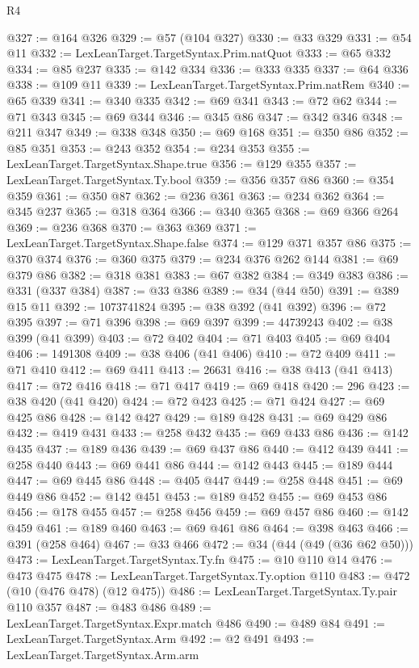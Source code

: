 \begin{lexlean}{R4}
\begin{coremodule}
@327 := @164 @326
@329 := @57 (@104 @327)
@330 := @33 @329
@331 := @54 @11
@332 := LexLeanTarget.TargetSyntax.Prim.natQuot
@333 := @65 @332
@334 := @85 @237
@335 := @142 @334
@336 := @333 @335
@337 := @64 @336
@338 := @109 @11
@339 := LexLeanTarget.TargetSyntax.Prim.natRem
@340 := @65 @339
@341 := @340 @335
@342 := @69 @341
@343 := @72 @62
@344 := @71 @343
@345 := @69 @344
@346 := @345 @86
@347 := @342 @346
@348 := @211 @347
@349 := @338 @348
@350 := @69 @168
@351 := @350 @86
@352 := @85 @351
@353 := @243 @352
@354 := @234 @353
@355 := LexLeanTarget.TargetSyntax.Shape.true
@356 := @129 @355
@357 := LexLeanTarget.TargetSyntax.Ty.bool
@359 := @356 @357 @86
@360 := @354 @359
@361 := @350 @87
@362 := @236 @361
@363 := @234 @362
@364 := @345 @237
@365 := @318 @364
@366 := @340 @365
@368 := @69 @366 @264
@369 := @236 @368
@370 := @363 @369
@371 := LexLeanTarget.TargetSyntax.Shape.false
@374 := @129 @371 @357 @86
@375 := @370 @374
@376 := @360 @375
@379 := @234 @376 @262 @144
@381 := @69 @379 @86
@382 := @318 @381
@383 := @67 @382
@384 := @349 @383
@386 := @331 (@337 @384)
@387 := @33 @386
@389 := @34 (@44 @50)
@391 := @389 @15 @11
@392 := 1073741824
@395 := @38 @392 (@41 @392)
@396 := @72 @395
@397 := @71 @396
@398 := @69 @397
@399 := 44739243
@402 := @38 @399 (@41 @399)
@403 := @72 @402
@404 := @71 @403
@405 := @69 @404
@406 := 1491308
@409 := @38 @406 (@41 @406)
@410 := @72 @409
@411 := @71 @410
@412 := @69 @411
@413 := 26631
@416 := @38 @413 (@41 @413)
@417 := @72 @416
@418 := @71 @417
@419 := @69 @418
@420 := 296
@423 := @38 @420 (@41 @420)
@424 := @72 @423
@425 := @71 @424
@427 := @69 @425 @86
@428 := @142 @427
@429 := @189 @428
@431 := @69 @429 @86
@432 := @419 @431
@433 := @258 @432
@435 := @69 @433 @86
@436 := @142 @435
@437 := @189 @436
@439 := @69 @437 @86
@440 := @412 @439
@441 := @258 @440
@443 := @69 @441 @86
@444 := @142 @443
@445 := @189 @444
@447 := @69 @445 @86
@448 := @405 @447
@449 := @258 @448
@451 := @69 @449 @86
@452 := @142 @451
@453 := @189 @452
@455 := @69 @453 @86
@456 := @178 @455
@457 := @258 @456
@459 := @69 @457 @86
@460 := @142 @459
@461 := @189 @460
@463 := @69 @461 @86
@464 := @398 @463
@466 := @391 (@258 @464)
@467 := @33 @466
@472 := @34 (@44 (@49 (@36 @62 @50)))
@473 := LexLeanTarget.TargetSyntax.Ty.fn
@475 := @10 @110 @14
@476 := @473 @475
@478 := LexLeanTarget.TargetSyntax.Ty.option @110
@483 := @472 (@10 (@476 @478) (@12 @475))
@486 := LexLeanTarget.TargetSyntax.Ty.pair @110 @357
@487 := @483 @486
@489 := LexLeanTarget.TargetSyntax.Expr.match @486
@490 := @489 @84
@491 := LexLeanTarget.TargetSyntax.Arm
@492 := @2 @491
@493 := LexLeanTarget.TargetSyntax.Arm.arm

\end{coremodule}
\end{lexlean}
